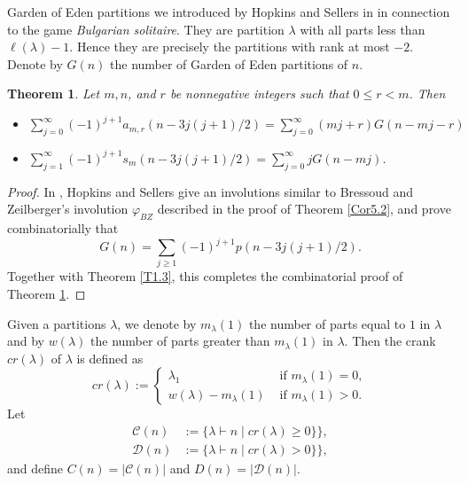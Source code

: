 \documentclass{amsart}
\newtheorem{theorem}{Theorem}[section]
\theoremstyle{definition}
\begin{document}
Garden of Eden partitions we introduced by Hopkins and Sellers in \cite {HS} in connection to the game \textit{Bulgarian solitaire}. They are partition $\lambda$ with all parts less than $\ell(\lambda)-1$. Hence they are precisely the partitions with rank at most $-2$. Denote by $G(n)$ the number of Garden of Eden partitions of $n$. 

\begin{theorem}{\cite[Corollaries 6.2 and 6.3]{M23}} \label{Cor6.2} Let $m,n$, and $r$ be nonnegative integers such that $0\leq r<m$. Then \begin{itemize}\item[(i)] $\displaystyle \sum_{j=0}^\infty (-1)^{j+1} a_{m,r}(n-3j(j+1)/2)= \sum_{j=0}^\infty (mj+r)G(n-mj-r)$
\item[(ii)] $\displaystyle \sum_{j=1}^\infty (-1)^{j+1} s_{m}(n-3j(j+1)/2)= \sum_{j=0}^\infty jG(n-mj)$.
\end{itemize}\end{theorem}

\begin{proof}In \cite{HS}, Hopkins and Sellers give an involutions similar to Bressoud and Zeilberger's involution $\varphi_{BZ}$ described in the proof of Theorem \ref{Cor5.2}, and prove combinatorially that $$G(n)=\sum_{j\geq 1}(-1)^{j+1}p(n-3j(j+1)/2).$$ Together with Theorem \ref{T1.3}, this completes the combinatorial proof of Theorem \ref{Cor6.2}. 
\end{proof}

Given a partitions $\lambda$, we denote by $m_\lambda(1)$  the number of parts equal to $1$ in $\lambda$ and by $w(\lambda)$  the number of parts greater than $m_\lambda(1)$ in $\lambda$. Then the crank $cr(\lambda)$ of $\lambda$ is defined \cite{AG} as $$cr(\lambda):=\begin{cases}\lambda_1 & \text{ if } m_\lambda(1)=0,\\ w(\lambda)-m_\lambda(1) & \text{ if } m_\lambda(1)>0.\end{cases}$$ Let \begin{align*}\mathcal C(n)&:=\{\lambda \vdash n \mid cr(\lambda)\geq 0\}\},\\ \mathcal D(n)&:=\{\lambda \vdash n \mid cr(\lambda)> 0\}\},
\end{align*} and define $C(n)=|\mathcal C(n)|$ and $D(n)=|\mathcal D(n)|$.
\end{document}
